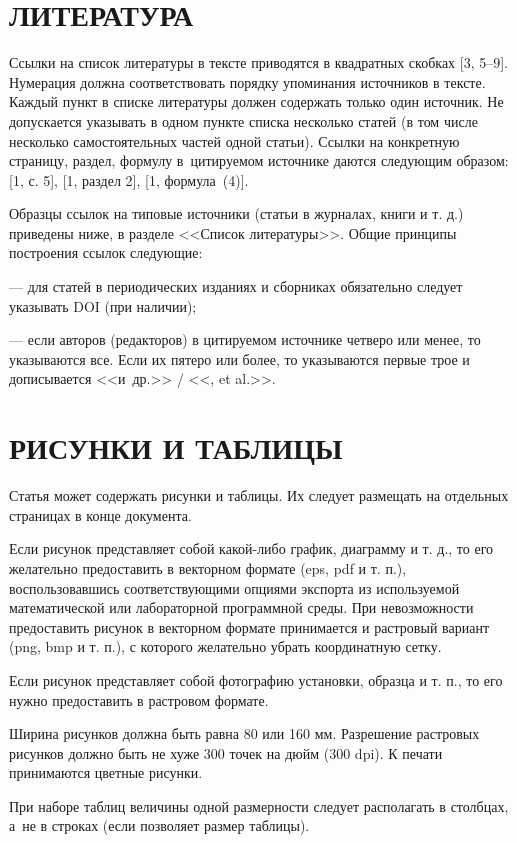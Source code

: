 \documentclass[12pt, a4paper]{article}
\begin{document}
\section{ЛИТЕРАТУРА}

Ссылки на список литературы в тексте приводятся в квадратных скобках [3, 5--9]. Нумерация должна соответствовать порядку упоминания источников в тексте. Каждый пункт в списке литературы должен содержать только один источник. Не допускается указывать в одном пункте списка несколько статей (в том числе несколько самостоятельных частей одной статьи). Ссылки на конкретную страницу, раздел, формулу в~цитируемом источнике даются следующим образом: [1, с. 5], [1, раздел 2], [1, формула~(4)].

Образцы ссылок на типовые источники (статьи в журналах, книги и т. д.) приведены ниже, в разделе <<Список литературы>>. Общие принципы построения ссылок следующие:

--- для статей в периодических изданиях и сборниках обязательно следует указывать DOI (при наличии);

--- если авторов (редакторов) в цитируемом источнике четверо или менее, то указываются все. Если их пятеро или более, то указываются первые трое и дописывается <<и~др.>> / <<, et al.>>.

\section{РИСУНКИ И ТАБЛИЦЫ}

Статья может содержать рисунки и таблицы. Их следует размещать на отдельных страницах в конце документа.

Если рисунок представляет собой какой-либо график, диаграмму и т. д., то его желательно предоставить в векторном формате (eps, pdf и т. п.), воспользовавшись соответствующими опциями экспорта из используемой математической или лабораторной программной среды. При невозможности предоставить рисунок в векторном формате принимается и растровый вариант (png, bmp и т. п.), с которого желательно убрать координатную сетку.

Если рисунок представляет собой фотографию установки, образца и т. п., то его нужно предоставить в растровом формате.

Ширина рисунков должна быть равна 80 или 160 мм. Разрешение растровых рисунков должно быть не хуже 300 точек на дюйм (300 dpi). К печати принимаются цветные рисунки.

При наборе таблиц величины одной размерности следует располагать в столбцах, а~не в строках (если позволяет размер таблицы).
\end{document}
